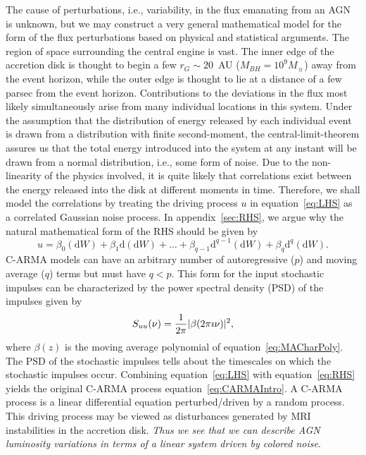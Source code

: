\documentclass[a4paper,fleqn,usenatbib]{mnras}
\begin{document}
The cause of perturbations, i.e., variability, in the flux emanating from an AGN is unknown, but we may construct a very general mathematical model for the form of the flux perturbations based on physical and statistical arguments. The region of space surrounding the central engine is vast. The inner edge of the accretion disk is thought to begin a few $r_{G} \sim 20$~AU ($M_{BH} = 10^{9} M_{\sun}$) away from the event horizon, while the outer edge is thought to lie at a distance of a few parsec from the event horizon. Contributions to the deviations in the flux most likely simultaneously arise from many individual locations in this system. Under the assumption that the distribution of energy released by each individual event is drawn from a distribution with finite second-moment, the central-limit-theorem assures us that the total energy introduced into the system at any instant will be drawn from a normal distribution, i.e., some form of noise. Due to the non-linearity of the physics involved, it is quite likely that correlations exist between the energy released into the disk at different moments in time. Therefore, we shall model the correlations by treating the driving process $u$ in equation~\eqref{eq:LHS} as a correlated Gaussian noise process. In appendix~\ref{sec:RHS}, we argue why the natural mathematical form of the RHS should be given by
\begin{equation}\label{eq:RHS}
u = \beta_{0} (\mathrm{d}W) + \beta_{1} \mathrm{d}(\mathrm{d}W) + \ldots + \beta_{q-1} \mathrm{d}^{q-1}(\mathrm{d}W) + \beta_{q} \mathrm{d}^{q}(\mathrm{d}W).
\end{equation}
C-ARMA models can have an arbitrary number of autoregressive ($p$) and moving average ($q$) terms but must have $q < p$. This form for the input stochastic impulses can be characterized by the power spectral density (PSD) of the impulses given by
\begin{equation}\label{eq:ImpulsePSD}
S_{uu}(\nu) = \frac{1}{2 \pi } |\beta(2 \pi \imath \nu)|^{2},
\end{equation}
where $\beta(z)$ is the moving average polynomial of equation~\eqref{eq:MACharPoly}. The PSD of the stochastic impulses tells about the timescales on which the stochastic impulses occur. Combining equation~\eqref{eq:LHS} with equation~\eqref{eq:RHS} yields the original C-ARMA process equation~\eqref{eq:CARMAIntro}. A C-ARMA process is a linear differential equation perturbed/driven by a random process. This driving process may be viewed as disturbances generated by MRI instabilities in the accretion disk. \textit{Thus we see that we can describe AGN luminosity variations in terms of a linear system driven by colored noise}.
\end{document}
